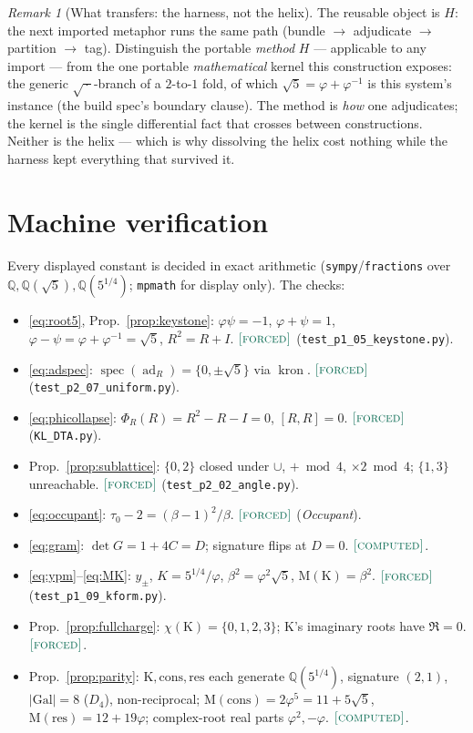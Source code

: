 \documentclass[11pt]{article}
\theoremstyle{plain}
\theoremstyle{definition}
\theoremstyle{remark}
\newtheorem{remark}[theorem]{Remark}
\newcommand{\forced}{\textup{\textcolor{forcedc}{\textsc{[forced]}}}}
\newcommand{\computed}{\textup{\textcolor{forcedc}{\textsc{[computed]}}}}
\newcommand{\Q}{\mathbb{Q}}
\newcommand{\Mah}{\mathrm{M}}
\newcommand{\adR}{\operatorname{ad}_R}
\newcommand{\abs}[1]{\left\lvert #1 \right\rvert}
\newcommand{\Kf}{\mathrm{K}}
\begin{document}
\begin{remark}[What transfers: the harness, not the helix]\label{rem:transfer}
The reusable object is $H$: the next imported metaphor runs the same path (bundle $\to$ adjudicate $\to$
partition $\to$ tag). Distinguish the portable \emph{method} $H$ --- applicable to any import --- from the one
portable \emph{mathematical} kernel this construction exposes: the generic $\sqrt{\,\cdot\,}$-branch of a
$2$-to-$1$ fold, of which $\sqrt5=\varphi+\varphi^{-1}$ is this system's instance (the build spec's boundary
clause). The method is \emph{how} one adjudicates; the kernel is the single differential fact that crosses
between constructions. Neither is the helix --- which is why dissolving the helix cost nothing while the harness
kept everything that survived it.
\end{remark}

\appendix
\section{Machine verification}\label{app:verify}

Every displayed constant is decided in exact arithmetic (\texttt{sympy}/\texttt{fractions} over
$\Q,\Q(\sqrt5),\Q(5^{1/4})$; \texttt{mpmath} for display only). The checks:
\begin{itemize}[leftmargin=1.4em,itemsep=1pt]
\item \eqref{eq:root5}, Prop.~\ref{prop:keystone}: $\varphi\psi=-1$, $\varphi+\psi=1$, $\varphi-\psi=\varphi+\varphi^{-1}=\sqrt5$, $R^2=R+I$. $\forced$ (\texttt{test\_p1\_05\_keystone.py}).
\item \eqref{eq:adspec}: $\operatorname{spec}(\adR)=\{0,\pm\sqrt5\}$ via $\operatorname{kron}$. $\forced$ (\texttt{test\_p2\_07\_uniform.py}).
\item \eqref{eq:phicollapse}: $\Phi_R(R)=R^2-R-I=0$, $[R,R]=0$. $\forced$ (\texttt{KL\_DTA.py}).
\item Prop.~\ref{prop:sublattice}: $\{0,2\}$ closed under $\cup$, $+\bmod4$, $\times2\bmod4$; $\{1,3\}$ unreachable. $\forced$ (\texttt{test\_p2\_02\_angle.py}).
\item \eqref{eq:occupant}: $\tau_0-2=(\beta-1)^2/\beta$. $\forced$ (\emph{Occupant}).
\item \eqref{eq:gram}: $\det G=1+4C=D$; signature flips at $D=0$. $\computed$.
\item \eqref{eq:ypm}--\eqref{eq:MK}: $y_\pm$, $K=5^{1/4}/\varphi$, $\beta^2=\varphi^2\sqrt5$, $\Mah(\Kf)=\beta^2$. $\forced$ (\texttt{test\_p1\_09\_kform.py}).
\item Prop.~\ref{prop:fullcharge}: $\chi(\Kf)=\{0,1,2,3\}$; $\Kf$'s imaginary roots have $\Re=0$. $\forced$.
\item Prop.~\ref{prop:parity}: $\Kf,\mathrm{cons},\mathrm{res}$ each generate $\Q(5^{1/4})$, signature $(2,1)$, $\abs{\mathrm{Gal}}=8$ ($D_4$), non-reciprocal; $\Mah(\mathrm{cons})=2\varphi^5=11+5\sqrt5$, $\Mah(\mathrm{res})=12+19\varphi$; complex-root real parts $\varphi^2,-\varphi$. $\computed$.
\end{itemize}
\end{document}
